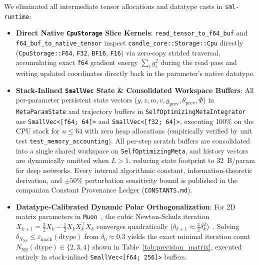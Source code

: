 \documentclass[10pt,twocolumn,letterpaper]{article}
\theoremstyle{definition}
\theoremstyle{remark}
\newcommand{\epsmach}{\varepsilon_{\mathrm{mach}}}
\begin{document}
We eliminated all intermediate tensor allocations and datatype casts in \texttt{sml-runtime}:
\begin{itemize}[leftmargin=*,nosep]
  \item \textbf{Direct Native \texttt{CpuStorage} Slice Kernels}: \texttt{read\_tensor\_to\_f64\_buf} and \texttt{f64\_buf\_to\_native\_tensor} inspect \texttt{candle\_core::Storage::Cpu} directly (\texttt{CpuStorage::F64}, \texttt{F32}, \texttt{BF16}, \texttt{F16}) via zero-copy strided traversal, accumulating exact \texttt{f64} gradient energy $\sum_i g_i^2$ during the read pass and writing updated coordinates directly back in the parameter's native datatype.
  \item \textbf{Stack-Inlined \texttt{SmallVec} State \& Consolidated Workspace Buffers}: All per-parameter persistent state vectors ($y, z, m, v, g_{\mathrm{prev}}, \theta_{\mathrm{prev}}, \Phi$) in \texttt{MetaParamState} and trajectory buffers in \texttt{SelfOptimizingMetaIntegrator} use \texttt{SmallVec<[f64; 64]>} and \texttt{SmallVec<[f32; 64]>}, executing 100\% on the CPU stack for $n \le 64$ with zero heap allocations (empirically verified by unit test \texttt{test\_memory\_accounting}). All per-step scratch buffers are consolidated into a single shared workspace on \texttt{SelfOptimizingMeta}, and history vectors are dynamically omitted when $L > 1$, reducing state footprint to 32~B/param for deep networks. Every internal algorithmic constant, information-theoretic derivation, and $\pm 50\%$ perturbation sensitivity bound is published in the companion Constant Provenance Ledger (\texttt{CONSTANTS.md}).
  \item \textbf{Datatype-Calibrated Dynamic Polar Orthogonalization}: For 2D matrix parameters in \texttt{Muon}~\cite{jordan2024muon}, the cubic Newton-Schulz iteration $X_{k+1} = \frac{3}{2}X_k - \frac{1}{2}X_k X_k^\top X_k$ converges quadratically ($\delta_{k+1} \approx \frac{3}{2}\delta_k^2$)~\cite{higham2008functions}. Solving $\delta_{N_{\mathrm{NS}}} \le \epsmach(\mathrm{dtype})$ from $\delta_0 \approx 0.3$ yields the exact minimal iteration count $N_{\mathrm{NS}}(\mathrm{dtype}) \in \{2, 3, 4\}$ shown in Table~\ref{tab:precision_matrix}, executed entirely in stack-inlined \texttt{SmallVec<[f64; 256]>} buffers.
\end{itemize}
\end{document}
